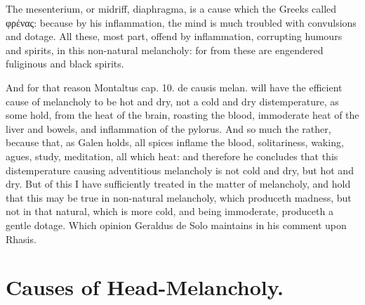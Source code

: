 {{The mesenterium, or midriff, diaphragma, is a cause which the
Greeks called \textgreek{φρένας}: because by his inflammation, the mind is
much troubled with convulsions and dotage. All these, most part, offend
by inflammation, corrupting humours and spirits, in this non-natural
melancholy: for from these are engendered fuliginous and black spirits.

And for that reason \textlatin{Montaltus cap. 10. de causis melan.} will have
the efficient cause of melancholy to be hot and dry, not a cold and dry
distemperature, as some hold, from the heat of the brain, roasting the
blood, immoderate heat of the liver and bowels, and inflammation of the
pylorus. And so much the rather, because that, as Galen holds, all
spices inflame the blood, solitariness, waking, agues, study,
meditation, all which heat: and therefore he concludes that this
distemperature causing adventitious melancholy is not cold and dry, but
hot and dry. But of this I have sufficiently treated in the matter of
melancholy, and hold that this may be true in non-natural melancholy,
which produceth madness, but not in that natural, which is more cold,
and being immoderate, produceth a gentle dotage. Which opinion
Geraldus de Solo maintains in his comment upon Rhasis.

\section{Causes of Head-Melancholy.}

}}
